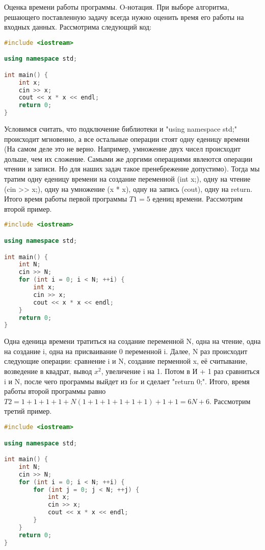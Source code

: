 \documentclass[a4paper,12pt]{article}
\begin{document}
Оценка времени работы программы. O-нотация.
При выборе алгоритма, решающего поставленную задачу всегда нужно оценить время его работы на входных данных. Рассмотрима следующий код:
\begin{lstlisting}[language=C++]
#include <iostream>

using namespace std;

int main() {
    int x;
    cin >> x;
    cout << x * x << endl;
    return 0;
}
\end{lstlisting}
Условимся считать, что подключение библиотеки и "using namespace std;" происходит мгновенно, а все остальные операции стоят одну еденицу времени
(На самом деле это не верно. Например, умножение двух чисел происходит дольше, чем их сложение. Самыми же доргими операциями явлеются операции
чтении и записи. Но для наших задач такое пренебрежение допустимо). Тогда мы тратим одну еденицу времени на создание переменной (int x;),
одну на чтение (cin >> x;), одну на умножение (x * x), одну на запись (cout), одну на return. Итого время работы первой программы $T1 = 5$ едениц
времени.\newline
Рассмотрим второй пример.
\begin{lstlisting}[language=C++]
#include <iostream>

using namespace std;

int main() {
    int N;
    cin >> N;
    for (int i = 0; i < N; ++i) {
        int x;
        cin >> x;
        cout << x * x << endl;
    }
    return 0;
}
\end{lstlisting}
Одна еденица времени тратиться на создание переменной N, одна на чтение, одна на создание i, одна на присваивание 0 переменной i. Далее, N раз
происходит следующие операции: сравнение i и N, создание перменной x, её считывание, возведение в квадрат, вывод $x^2$, увеличение i на 1. Потом
в И + 1 раз сравниться i и N, после чего программы выйдет из for и сделает "return 0;". Итого, время работы второй программы равно $T2 = 1 + 1 + 1
+ 1 + N(1 + 1 + 1 + 1 + 1 + 1) + 1 + 1 = 6N + 6$.\newline
Рассмотрим третий пример.
\begin{lstlisting}[language=C++]
#include <iostream>

using namespace std;

int main() {
    int N;
    cin >> N;
    for (int i = 0; i < N; ++i) {
        for (int j = 0; j < N; ++j) {
            int x;
            cin >> x;
            cout << x * x << endl;
        }
    }
    return 0;
}
\end{lstlisting}
\end{document}
